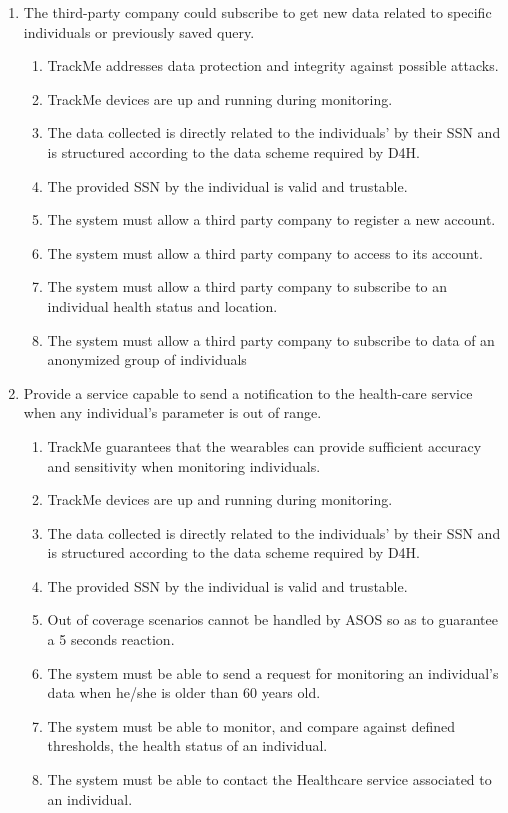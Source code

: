 \documentclass[hidelinks, 12pt]{report}
\newcommand\requirement[1]{\item[{[R#1]}] }
\newcommand\goal[1]{\item[{[G#1]}] }
\newcommand\assumption[1]{\item[{[D#1]}] }
\begin{document}
\begin{enumerate}
		\goal{4} The third-party company could subscribe to get new data related to specific individuals or previously saved query.
		\begin{enumerate}
			\assumption{2} TrackMe addresses data protection and integrity against possible attacks.
			\assumption{3} TrackMe devices are up and running during monitoring.
			\assumption{4} The data collected is directly related to the individuals' by their SSN and is structured according to the data scheme required by D4H.
			\assumption{5} The provided SSN by the individual is valid and trustable.
			\requirement{5} The system must allow a third party company to register a new account.
			\requirement{6} The system must allow a third party company to access to its account.
			\requirement{11} The system must allow a third party company to subscribe to an individual health status and location.
			\requirement{12} The system must allow a third party company to subscribe to data of an anonymized group of individuals
		\end{enumerate}
		
		\goal{5} Provide a service capable to send a notification to the health-care service when any individual's parameter is out of range.
		\begin{enumerate}
			\assumption{1} TrackMe guarantees that the wearables can provide sufficient accuracy and sensitivity when monitoring individuals.
			\assumption{3} TrackMe devices are up and running during monitoring.
			\assumption{4} The data collected is directly related to the individuals' by their SSN and is structured according to the data scheme required by D4H.
			\assumption{5} The provided SSN by the individual is valid and trustable.
			\assumption{6} Out of coverage scenarios cannot be handled by ASOS so as to guarantee a 5 seconds reaction.
			\requirement{13} The system must be able to send a request for monitoring an individual's data when he/she is older than 60 years old.
			\requirement{14} The system must be able to monitor, and compare against defined thresholds, the health status of an individual.
			\requirement{15} The system must be able to contact the Healthcare service associated to an individual.
		\end{enumerate}
		

\end{enumerate}
\end{document}
